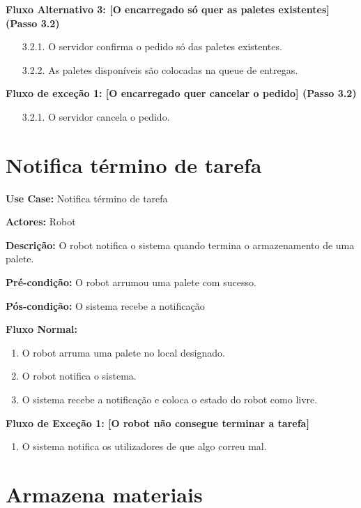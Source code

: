 \documentclass[a4paper]{report}
\begin{document}
\textbf{Fluxo Alternativo 3: [O encarregado só quer as paletes existentes] (Passo 3.2)}
\begin{enumerate}
    \item [3.2.1.] O servidor confirma o pedido só das paletes existentes.
    \item [3.2.2.] As paletes disponíveis são colocadas na queue de entregas.
\end{enumerate}
    
\textbf{Fluxo de exceção 1: [O encarregado quer cancelar o pedido] (Passo 3.2)}
\begin{enumerate}
    \item [3.2.1.] O servidor cancela o pedido.
\end{enumerate}
    

\newpage

\section{Notifica término de tarefa}

\textbf{Use Case:} Notifica término de tarefa

\textbf{Actores:} Robot

\textbf{Descrição:} O robot notifica o sistema quando termina o armazenamento de uma palete. 


\textbf{Pré-condição:}  O robot arrumou uma palete com sucesso.

\textbf{Pós-condição:} O sistema recebe a notificação 

\textbf{Fluxo Normal:} 
\begin{enumerate}

    \item O robot arruma uma palete no local designado.
    \item O robot notifica o sistema.
    \item O sistema recebe a notificação e coloca o estado do robot como livre.

\end{enumerate}

\textbf{Fluxo de Exceção 1: [O robot não consegue terminar a tarefa]}
\begin{enumerate}
    \item O sistema notifica os utilizadores de que algo correu mal.
\end{enumerate}



\newpage

\section{Armazena materiais}
\end{document}
